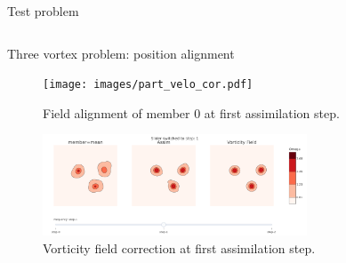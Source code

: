\documentclass[aspectratio=169]{beamer} %
\begin{document}
\begin{frame}{Test problem}
\begin{columns}[t]
\begin{column}{0.55\textwidth}
        \end{column}
    \end{columns}
    \vspace{-0.5cm}

\end{frame}

\begin{frame}{Three vortex problem: position alignment}
    \begin{figure}
        \centering
        \texttt{[image: images/part\_velo\_cor.pdf]}
        \caption*{\tiny Field alignment of member 0 at first assimilation step.}
    \end{figure}
    \vspace{-0.25cm}
    \begin{figure}
        \centering
        \includegraphics[width=0.7\textwidth]{images/mean_vorticity.pdf}
        \caption*{\tiny Vorticity field correction at first assimilation step.}
    \end{figure}
    \vspace{-0.25cm}
\end{frame}
\end{document}

